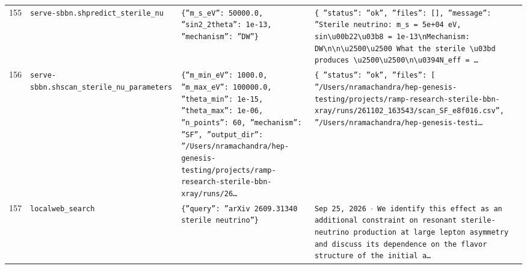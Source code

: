 \documentclass[11pt,a4paper]{article}
\begin{document}
\begin{longtable}{@{}p{}p{}p{}p{}@{}}
155 & \texttt{serve-sbbn.sh}\newline\texttt{predict\_\allowbreak{}sterile\_\allowbreak{}nu} & \texttt{\{''m\_\allowbreak{}s\_\allowbreak{}eV'':\allowbreak{} 50000.0,\allowbreak{} ''sin2\_\allowbreak{}2theta'':\allowbreak{} 1e-13,\allowbreak{} ''mechanism'':\allowbreak{} ''DW''\}\allowbreak{}} & \texttt{\{   ''status'':\allowbreak{} ''ok'',\allowbreak{}   ''files'':\allowbreak{} []\allowbreak{},\allowbreak{}   ''message'':\allowbreak{} ''Sterile neutrino:\allowbreak{} m\_\allowbreak{}s =\allowbreak{} 5e+04 eV,\allowbreak{} sin\textbackslash{}\allowbreak{}u00b22\textbackslash{}\allowbreak{}u03b8 =\allowbreak{} 1e-13\textbackslash{}\allowbreak{}nMechanism:\allowbreak{} DW\textbackslash{}\allowbreak{}n\textbackslash{}\allowbreak{}n\textbackslash{}\allowbreak{}u2500\textbackslash{}\allowbreak{}u2500 What the sterile \textbackslash{}\allowbreak{}u03bd produces \textbackslash{}\allowbreak{}u2500\textbackslash{}\allowbreak{}u2500\textbackslash{}\allowbreak{}n\textbackslash{}\allowbreak{}u0394N\_\allowbreak{}eff =\allowbreak{} \ldots{}\allowbreak{}} \\
156 & \texttt{serve-sbbn.sh}\newline\texttt{scan\_\allowbreak{}sterile\_\allowbreak{}nu\_\allowbreak{}parameters} & \texttt{\{''m\_\allowbreak{}min\_\allowbreak{}eV'':\allowbreak{} 1000.0,\allowbreak{} ''m\_\allowbreak{}max\_\allowbreak{}eV'':\allowbreak{} 100000.0,\allowbreak{} ''theta\_\allowbreak{}min'':\allowbreak{} 1e-15,\allowbreak{} ''theta\_\allowbreak{}max'':\allowbreak{} 1e-06,\allowbreak{} ''n\_\allowbreak{}points'':\allowbreak{} 60,\allowbreak{} ''mechanism'':\allowbreak{} ''SF'',\allowbreak{} ''output\_\allowbreak{}dir'':\allowbreak{} ''/\allowbreak{}Users/\allowbreak{}nramachandra/\allowbreak{}hep-genesis-testing/\allowbreak{}projects/\allowbreak{}ramp-research-sterile-bbn-xray/\allowbreak{}runs/\allowbreak{}26\ldots{}\allowbreak{}} & \texttt{\{   ''status'':\allowbreak{} ''ok'',\allowbreak{}   ''files'':\allowbreak{} [     ''/\allowbreak{}Users/\allowbreak{}nramachandra/\allowbreak{}hep-genesis-testing/\allowbreak{}projects/\allowbreak{}ramp-research-sterile-bbn-xray/\allowbreak{}runs/\allowbreak{}261102\_\allowbreak{}163543/\allowbreak{}scan\_\allowbreak{}SF\_\allowbreak{}e8f016.csv'',\allowbreak{}     ''/\allowbreak{}Users/\allowbreak{}nramachandra/\allowbreak{}hep-genesis-testi\ldots{}\allowbreak{}} \\
157 & \texttt{local}\newline\texttt{web\_\allowbreak{}search} & \texttt{\{''query'':\allowbreak{} ''arXiv 2609.31340 sterile neutrino''\}\allowbreak{}} & \texttt{Sep 25,\allowbreak{} 2026 $\cdot$ We identify this effect as an additional constraint on resonant sterile-neutrino production at large lepton asymmetry and discuss its dependence on the flavor structure of the initial a\ldots{}\allowbreak{}} \\

\end{longtable}
\end{document}
